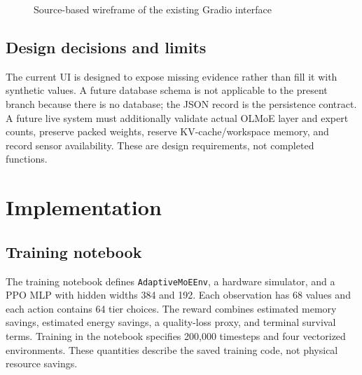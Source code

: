\documentclass[12pt,a4paper]{report}
\begin{document}
\begin{figure}[ht]
\centering
{}
\caption{Source-based wireframe of the existing Gradio interface}
\label{fig:ui}
\end{figure}

\section{Design decisions and limits}
The current UI is designed to expose missing evidence rather than fill it with synthetic values. A future database schema is not applicable to the present branch because there is no database; the JSON record is the persistence contract. A future live system must additionally validate actual OLMoE layer and expert counts, preserve packed weights, reserve KV-cache/workspace memory, and record sensor availability. These are design requirements, not completed functions.

\chapter{Implementation}
\section{Training notebook}
The training notebook defines \texttt{AdaptiveMoEEnv}, a hardware simulator, and a PPO MLP with hidden widths 384 and 192. Each observation has 68 values and each action contains 64 tier choices. The reward combines estimated memory savings, estimated energy savings, a quality-loss proxy, and terminal survival terms. Training in the notebook specifies 200,000 timesteps and four vectorized environments. These quantities describe the saved training code, not physical resource savings.
\end{document}
